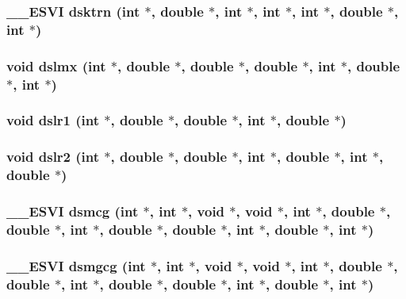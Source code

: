 \subsubsection{\setlength{\rightskip}{0pt plus 5cm}\_\-\_\-ESVI dsktrn (int $\ast$, double $\ast$, int $\ast$, int $\ast$, int $\ast$, double $\ast$, int $\ast$)}\label{essl_8h_06bee50f6b86a83051a7f863d2d9c63b}


\subsubsection{\setlength{\rightskip}{0pt plus 5cm}void dslmx (int $\ast$, double $\ast$, double $\ast$, double $\ast$, int $\ast$, double $\ast$, int $\ast$)}\label{essl_8h_6cfe42dc177b63f0cf633ac901dbb0a7}


\subsubsection{\setlength{\rightskip}{0pt plus 5cm}void dslr1 (int $\ast$, double $\ast$, double $\ast$, int $\ast$, double $\ast$)}\label{essl_8h_b8d69a9b4b81f10e0b90f7029a455491}


\subsubsection{\setlength{\rightskip}{0pt plus 5cm}void dslr2 (int $\ast$, double $\ast$, double $\ast$, int $\ast$, double $\ast$, int $\ast$, double $\ast$)}\label{essl_8h_04047a41c1417a9cd12c4b8ff1e86b5a}


\subsubsection{\setlength{\rightskip}{0pt plus 5cm}\_\-\_\-ESVI dsmcg (int $\ast$, int $\ast$, void $\ast$, void $\ast$, int $\ast$, double $\ast$, double $\ast$, int $\ast$, double $\ast$, double $\ast$, int $\ast$, double $\ast$, int $\ast$)}\label{essl_8h_1d8a36c4fb3b01dc504bee37c595fd31}


\subsubsection{\setlength{\rightskip}{0pt plus 5cm}\_\-\_\-ESVI dsmgcg (int $\ast$, int $\ast$, void $\ast$, void $\ast$, int $\ast$, double $\ast$, double $\ast$, int $\ast$, double $\ast$, double $\ast$, int $\ast$, double $\ast$, int $\ast$)}\label{essl_8h_55b5eab88f7b6d0ebd06f7ed1cb5ef1e}


